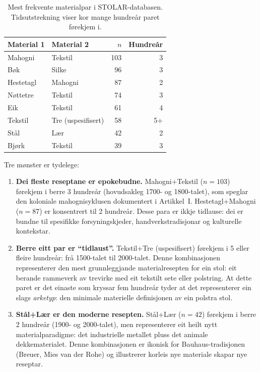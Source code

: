 \documentclass[10pt, a4paper, twocolumn]{article}
\begin{document}
\begin{table}[H]
\centering
\caption{Mest frekvente materialpar i STOLAR-databasen. Tidsutstrekning viser kor mange hundreår paret førekjem i.}
\label{tab:recipes}
\begin{tabular}{@{}llrr@{}}
\toprule
\textbf{Material 1} & \textbf{Material 2} & \textbf{$n$} & \textbf{Hundreår} \\
\midrule
Mahogni & Tekstil & 103 & 3 \\
Bøk & Silke & 96 & 3 \\
Hestetagl & Mahogni & 87 & 2 \\
Nøttetre & Tekstil & 74 & 3 \\
Eik & Tekstil & 61 & 4 \\
Tekstil & Tre (uspesifisert) & 58 & 5+ \\
Stål & Lær & 42 & 2 \\
Bjørk & Tekstil & 39 & 3 \\
\bottomrule
\end{tabular}
\end{table}

Tre mønster er tydelege:

\begin{enumerate}
  \item \textbf{Dei fleste reseptane er epokebudne.} Mahogni+Tekstil ($n = 103$) førekjem i berre 3 hundreår (hovudsakleg 1700- og 1800-talet), som speglar den koloniale mahognisyklusen dokumentert i Artikkel~I. Hestetagl+Mahogni ($n = 87$) er konsentrert til 2 hundreår. Desse para er ikkje tidlause: dei er bundne til spesifikke forsyningskjeder, handverkstradisjonar og kulturelle kontekstar.

  \item \textbf{Berre eitt par er ``tidlaust''.} Tekstil+Tre (uspesifisert) førekjem i 5 eller fleire hundreår: frå 1500-talet til 2000-talet. Denne kombinasjonen representerer den mest grunnleggjande materialresepten for ein stol: eit berande rammeverk av trevirke med eit tekstilt sete eller polstring. At dette paret er det einaste som kryssar fem hundreår tyder at det representerer ein slags \emph{arketyp}: den minimale materielle definisjonen av ein polstra stol.

  \item \textbf{Stål+Lær er den moderne resepten.} Stål+Lær ($n = 42$) førekjem i berre 2 hundreår (1900- og 2000-talet), men representerer eit heilt nytt materialparadigme: det industrielle metallet pluss det animale dekkematerialet. Denne kombinasjonen er ikonisk for Bauhaus-tradisjonen (Breuer, Mies van der Rohe) og illustrerer korleis nye materiale skapar nye reseptar.
\end{enumerate}
\end{document}
